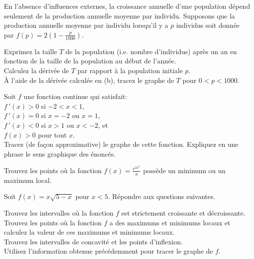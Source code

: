 \begin{question}[\life]
En l'absence d'influences externes, la croissance annuelle d'une
population dépend seulement de la production annuelle moyenne par
individu.  Supposons que la production annuelle moyenne par individu
lorsqu'il y a $p$ individus soit donnée par
$\displaystyle f(p) = 2\left( 1- \frac{p}{1000}\right)$.

 Exprimez la taille $T$ de la population (i.e. nombre d'individus)
après un an en fonction de la taille de la population au début de l'année.\\
 Calculez la dérivée de $T$ par rapport à la population
initiale $p$.\\
 À l'aide de la dérivée calculée en (b), tracez le graphe de
$T$ pour $0 < p < 1000$.
\label{6Q14}
\end{question}

\begin{question}
Soit $f$ une fonction continue qui satisfait:\\
 $f\,'(x)>0$ si $-2<x<1$,\\
 $f\,'(x)=0$ si $x=-2$ ou $x=1$,\\
 $f\,'(x)<0$ si $x>1$ ou $x<-2$, et\\
 $f(x)>0$ pour tout $x$.\\
Tracez (de façon approximative) le graphe de cette fonction.
Expliquez en une phrase le sens graphique des énoncés.
\label{6Q15}
\end{question}

\begin{question}
Trouvez les points où la fonction
$\displaystyle f(x)=\frac{e^{2x^2}}{x}$ possède un 
minimum ou un maximum local.
\label{6Q16}
\end{question}

\begin{question}
Soit $\displaystyle f(x) = x\sqrt{5-x}$ pour $x<5$.  Répondre aux questions
suivantes.

 Trouvez les intervalles où la fonction $f$ est strictement
croissante et décroissante.\\
 Trouvez les points où la fonction $f$ a des maximums et
minimums locaux et calculez la valeur de ces maximums et minimums
locaux.\\
 Trouvez les intervalles de concavité et les points
d'inflexion.\\
 Utilisez l'information obtenue précédemment pour tracer le
graphe de $f$.
\label{6Q17}
\end{question}

